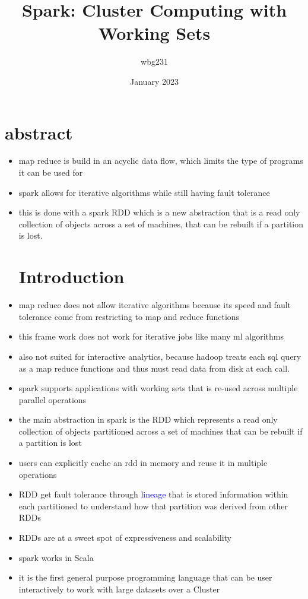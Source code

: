 \documentclass{article}
\title{Spark: Cluster Computing with Working Sets }
\author{wbg231 }
\date{January 2023}
\begin{document}
\maketitle

\section{abstract}
\begin{itemize}
\item map reduce is build in an acyclic data flow, which limits the type of programs it can be used for 
\item spark allows for iterative algorithms while still having fault tolerance
\item this is done with a spark RDD which is a new abstraction that is a read only collection of objects across a set of machines, that can be rebuilt if a partition is lost. 
\section*{Introduction}
\item map reduce does not allow iterative algorithms because its speed and fault tolerance come from restricting to map and reduce functions 
\item this frame work does not work for iterative jobs like many ml algorithms
\item also not suited for interactive analytics, because hadoop treats each sql query as a map reduce functions and thus must read data from disk at each call. 
\item spark supports applications with working sets that is re-used across multiple parallel operations 
\item the main abstraction in spark is the RDD which represents a read only collection of objects partitioned across a set of machines that can be rebuilt if a partition is lost
\item users can explicitly cache an rdd in memory and reuse it in multiple operations
\item RDD get fault tolerance through \textcolor{blue}{lineage} that is stored information within each partitioned to understand how that partition was derived from other RDDs
\item RDDs are at a sweet spot of expressiveness and scalability
\item spark works in Scala 
\item it is the first general purpose programming language that can be user interactively to work with large datasets over a Cluster

\end{itemize}
\end{document}

